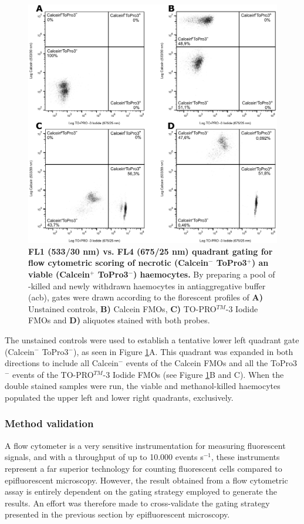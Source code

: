 \begin{figure}[h]
    \centering
    \includegraphics[width=.7\textwidth]{figures/Gating strategy/ToPro3 CAM gating strategy.pdf}
    \caption{\textbf{FL1 (533/30 nm) vs. FL4 (675/25 nm) quadrant gating for flow cytometric scoring of necrotic (Calcein$^{-}$ ToPro3$^{+}$) an viable (Calcein$^{+}$ ToPro3$^{-}$) haemocytes.} By preparing a pool of -killed and newly withdrawn haemocytes in antiaggregative buffer (\acrshort{acb}), gates were drawn according to the florescent profiles of \textbf{A)} Unstained controls, \textbf{B)} Calcein FMOs, \textbf{C)} TO-PRO$^{TM}$-3 Iodide FMOs and \textbf{D)} aliquotes stained with both probes.}
    \label{fig:TP3_Calcein_gating_strat}
\end{figure}

The unstained controls were used to establish a tentative lower left quadrant gate (Calcein$^{-}$ ToPro3$^{-}$), as seen in Figure \ref{fig:TP3_Calcein_gating_strat}A. This quadrant was expanded in both directions to include all Calcein$^{-}$ events of the Calcein FMOs and all the ToPro3$^{-}$ events of the TO-PRO$^{TM}$-3 Iodide FMOs (see Figure \ref{fig:TP3_Calcein_gating_strat}B and C). When the double stained samples were run, the viable and methanol-killed haemocytes populated the upper left and lower right quadrants, exclusively.

\subsubsection{Method validation}
A flow cytometer is a very sensitive instrumentation for measuring fluorescent signals, and with a throughput of up to 10.000 events s$^{-1}$, these instruments represent a far superior technology for counting fluorescent cells compared to epifluorescent microscopy. However, the result obtained from a flow cytometric assay is entirely dependent on the gating strategy employed to generate the results. An effort was therefore made to cross-validate the gating strategy presented in the previous section by epifluorescent microscopy.

